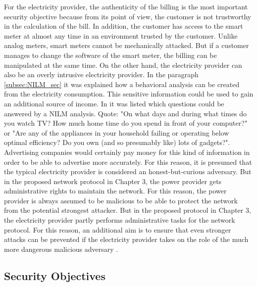 For the electricity provider, the authenticity of the billing is the most important security objective because from its point of view, the customer is not trustworthy in the calculation of the bill. In addition, the customer has access to the smart meter at almost any time in an environment trusted by the customer. Unlike analog meters, smart meters cannot be mechanically attacked. But if a customer manages to change the software of the smart meter, the billing can be manipulated at the same time. On the other hand, the electricity provider can also be an overly intrusive electricity provider. In the paragraph \ref{subsec:NILM_sec} it was explained how a behavioral analysis can be created from the electricity consumption. This sensitive information could be used to gain an additional source of income. In \cite{quinn2009privacy} it was listed which questions could be answered by a NILM analysis. Quote: "On what days and during what times do you watch TV? How much home time do you spend in front of your computer?" or "Are any of the appliances in your household failing or operating below optimal efficiency? Do you own (and so presumably like) lots of gadgets?". Advertising companies would certainly pay money for this kind of information in order to be able to advertise more accurately. For this reason, it is presumed that the typical electricity provider is considered an honest-but-curious adversary. But in the proposed network protocol in Chapter 3, the power provider gets administrative rights to maintain the network. For this reason, the power provider is always assumed to be malicious to be able to protect the network from the potential strongest attacker. But in the proposed protocol in Chapter 3, the electricity provider partly performs administrative tasks for the network protocol. For this reason, an additional aim is to ensure that even stronger attacks can be prevented if the electricity provider takes on the role of the much more dangerous malicious adversary \cite{lemay2007unified}.

\subsection{Security Objectives}

